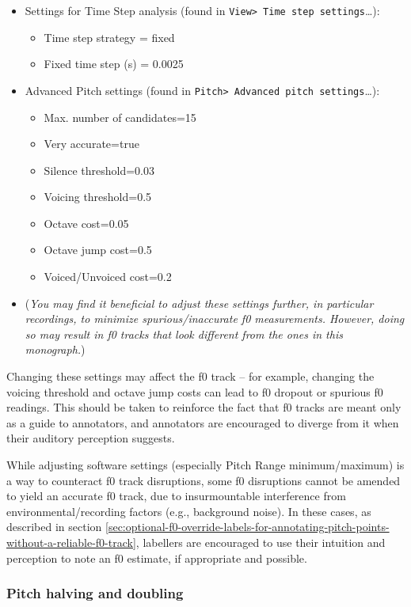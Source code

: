 \documentclass[11pt, twoside]{memoir}
\begin{document}
\begin{itemize}
\item Settings for Time Step analysis (found in \texttt{View> Time step settings}\ldots):
	\begin{itemize}
		\item Time step strategy = fixed
		\item Fixed time step (s) = 0.0025
	\end{itemize} 
\item Advanced Pitch settings (found in \texttt{Pitch> Advanced pitch settings}\ldots):
	\begin{itemize}
		\item Max. number of candidates=15
		\item Very accurate=true
		\item Silence threshold=0.03
		\item Voicing threshold=0.5
		\item Octave cost=0.05
		\item Octave jump cost=0.5
		\item Voiced/Unvoiced cost=0.2
	\end{itemize}
\item[] (\textit{You may find it beneficial to adjust these settings further, in particular recordings, to minimize spurious\slash inaccurate f0 measurements. However, doing so may result in f0 tracks that look different from the ones in this monograph.})
\end{itemize}

Changing these settings may affect the f0 track – for example, changing the voicing threshold and octave jump costs can lead to f0 dropout or spurious f0 readings. This should be taken to reinforce the fact that f0 tracks are meant only as a guide to annotators, and annotators are encouraged to diverge from it when their auditory perception suggests. 

While adjusting software settings (especially Pitch Range minimum\slash maximum) is a way to counteract f0 track disruptions, some f0 disruptions cannot be amended to yield an accurate f0 track, due to insurmountable interference from environmental\slash recording factors (e.g., background noise). In these cases, as described in section \ref{sec:optional-f0-override-labels-for-annotating-pitch-points-without-a-reliable-f0-track}, labellers are encouraged to use their intuition and perception to note an f0 estimate, if appropriate and possible. 

\subsubsection{Pitch halving and doubling}\label{sec:pitch-halving-and-doubling}
\end{document}
